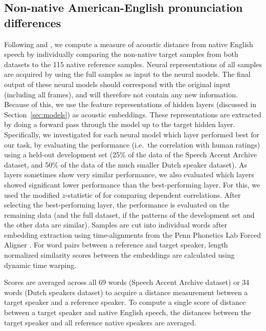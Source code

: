 \documentclass[11pt,a4paper]{article}
\begin{document}
\subsection{Non-native American-English pronunciation differences}
Following \citet{wieling2014a} and \citet{acoustic-measure}, we compute a measure of acoustic distance from native English speech by individually comparing the non-native target samples from both datasets to the 115 native reference samples. 
Neural representations of all samples are acquired by using the full samples as input to the neural models.
The final output of these neural models should correspond with the original input (including all frames), and will therefore not contain any new information.
Because of this, we use the feature representations of hidden layers (discussed in Section~\ref{sec:models}) as acoustic embeddings.
These representations are extracted by doing a forward pass through the model up to the target hidden layer.
Specifically, we investigated for each neural model which layer performed best for our task, by evaluating the performance (i.e.~the correlation with human ratings) using a held-out development set (25\% of the data of the Speech Accent Archive dataset, and 50\% of the data of the much smaller Dutch speaker dataset). As layers sometimes show very similar performance, we also evaluated which layers showed significant lower performance than the best-performing layer. For this, we used the modified $z$-statistic of \citet{steiger1980tests} for comparing dependent correlations. After selecting the best-performing layer, the performance is evaluated on the remaining data (and the full dataset, if the patterns of the development set and the other data are similar). Samples are cut into individual words after embedding extraction using time-alignments from the Penn Phonetics Lab Forced Aligner \citep{yuan2008speaker}.
For word pairs between a reference and target speaker, length normalized similarity scores between the embeddings are calculated using dynamic time warping.

Scores are averaged across all 69 words (Speech Accent Archive dataset) or 34 words (Dutch speakers dataset) to acquire a distance measurement between a target speaker and a reference speaker. To compute a single score of distance between a target speaker and native English speech, the distances between the target speaker and all reference native speakers are averaged. 
\end{document}
